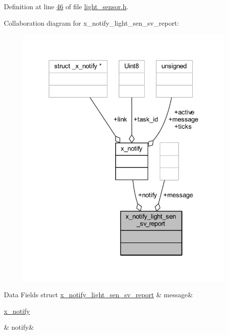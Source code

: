 Definition at line \hyperlink{a00018_source_l00046}{46} of file \hyperlink{a00018_source}{light\+\_\+sensor.\+h}.



Collaboration diagram for x\+\_\+notify\+\_\+light\+\_\+sen\+\_\+sv\+\_\+report\+:\nopagebreak
\begin{figure}[H]
\begin{center}
\leavevmode
\includegraphics[width=311pt]{d5/d54/a00938}
\end{center}
\end{figure}
\begin{DoxyFields}{Data Fields}
\hypertarget{a00018_a18ed963ee616596e9d500e042f228818}{struct \hyperlink{a00018_dc/d8c/a00859}{x\+\_\+notify\+\_\+light\+\_\+sen\+\_\+sv\+\_\+report}}\label{a00018_a18ed963ee616596e9d500e042f228818}
&
message&
\\
\hline

\hypertarget{a00018_a8e6a04c2283f9fd7b8dcbc62faba5847}{\hyperlink{a00036_df/d4c/a00851}{x\+\_\+notify}}\label{a00018_a8e6a04c2283f9fd7b8dcbc62faba5847}
&
notify&
\\
\hline

\end{DoxyFields}
\label{d0/d82/a00857}
\hypertarget{a00018_d0/d82/a00857}{}
